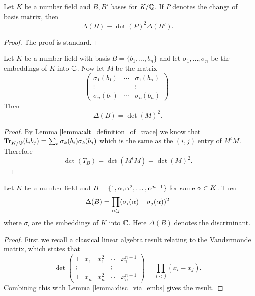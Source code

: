 \begin{lemma}\label{lem:disc_change_of_basis}
	\leanok
	Let $K$ be a number field and $B,B'$ bases for $K/\mathbb{Q}$. If $P$ denotes the change of basis matrix, then \[\Delta(B)=\det(P)^2 \Delta(B').\]
\end{lemma}
\begin{proof}
	\leanok
	The proof is standard.
\end{proof}

\begin{lemma}\label{lemma:disc_via_embs}
	\leanok
	Let $K$ be a number field with basis $B=\{b_1,\dots,b_n\}$ and let $\sigma_1,\dots,\sigma_n$ be the embeddings of $K$ into $\mathbb{C}$. Now let $M$ be the matrix  \[\left (\begin{matrix} \sigma_1(b_1) &\cdots& \sigma_1(b_n)\\ \vdots & & \vdots \\  \sigma_n(b_1) &\cdots& \sigma_n(b_n)
	\end{matrix} \right ).\] Then \[\Delta(B)=\det(M)^2.\]
\end{lemma}
\begin{proof}
	\leanok
	By Lemma \ref{lemma:alt_definition_of_trace} we know that  $\operatorname{Tr}_{K/\mathbb{Q}}(b_i b_j)= \sum_k \sigma_k(b_i)\sigma_k(b_j)$ which is the same as the $(i,j)$ entry of $M^t M$. Therefore \[\det(T_B)=\det(M^t M)=\det(M)^2.\]
\end{proof}

\begin{lemma}\label{lemma:disc_of_prim_elt_basis}
	\leanok
	Let $K$ be a number field and $B=\{1,\alpha,\alpha^2,\dots,\alpha^{n-1}\}$ for some $\alpha \in K$. Then \[\Delta(B)=\prod_{i < j} (\sigma_i(\alpha)-\sigma_j(\alpha))^2\] where $\sigma_i$ are the embeddings of $K $ into $\mathbb{C}$. Here $\Delta(B)$ denotes the discriminant.
\end{lemma}
\begin{proof}
	\leanok
	First we recall a classical linear algebra result relating to the Vandermonde matrix, which states that  \[\det \left (\begin{matrix} 1 & x_1& x_1^2&\cdots&x_1^{n-1} \\ \vdots & & & \vdots \\   1 & x_n& x_n^2&\cdots&x_n^{n-1}
	\end{matrix} \right ) =\prod_{i<j} (x_i-x_j).\] Combining this with Lemma \ref{lemma:disc_via_embs} gives the result.
\end{proof}

